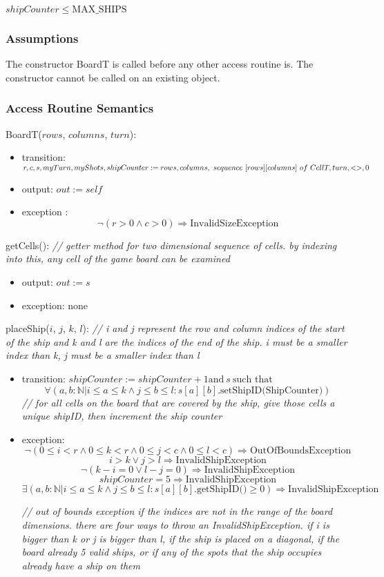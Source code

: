 \documentclass[12pt]{article}
\begin{document}
$shipCounter \leq \mbox{MAX\_SHIPS}$

\subsubsection* {Assumptions}
The constructor BoardT is called before any other access routine is. The constructor cannot be called on an existing object.

\subsubsection* {Access Routine Semantics}

BoardT($rows$, $columns$, $turn$):
\begin{itemize}
\item transition: $r, c, s, myTurn, myShots, shipCounter := rows, columns, ~sequence ~[rows][columns]~ of\newline ~CellT, turn, <>, 0$ 
\item output: $out := \mathit{self}$
\item exception : $$ \neg (r > 0 \wedge c > 0) \Rightarrow \mbox{InvalidSizeException} $$
\end{itemize}

\noindent getCells(): {\it // getter method for two dimensional sequence of cells. by indexing into this, any cell of the game board can be examined}
\begin{itemize}
\item output: $out := s$
\item exception: none
\end{itemize}

\noindent placeShip($i$, $j$, $k$, $l$): {\it // i and j represent the row and column indices of the start of the ship and k and l are the indices of the end of the ship. i must be a smaller index than k, j must be a smaller index than l}
\begin{itemize}
\item transition: $shipCounter := shipCounter + 1 \mbox{and} ~s ~\mbox{such that}$ 
$$ \forall (a, b : \mathbb{N} | i \leq a \leq k \wedge j \leq b \leq l : s[a][b].\mbox{setShipID(ShipCounter)})$$
{\it// for all cells on the board that are covered by the ship, give those cells a unique shipID, then increment the ship counter}
\item exception: 
$$ \neg (0 \leq i < r \wedge 0 \leq k < r \wedge 0 \leq j < c \wedge 0 \leq l < c) \Rightarrow \mbox{OutOfBoundsException} $$
$$ i > k \vee j > l \Rightarrow \mbox{InvalidShipException} $$
$$ \neg (k - i = 0 \vee l - j = 0) \Rightarrow \mbox{InvalidShipException} $$ 
$$ shipCounter = 5 \Rightarrow \mbox{InvalidShipException}$$
$$ \exists (a, b : \mathbb{N} | i \leq a \leq k \wedge j \leq b \leq l : s[a][b].\mbox{getShipID()} \geq 0 ) \Rightarrow \mbox{InvalidShipException}$$

{\it // out of bounds exception if the indices are not in the range of the board dimensions. there are four ways to throw an InvalidShipException. if i is bigger than k or j is bigger than l, if the ship is placed on a diagonal, if the board already 5 valid ships, or if any of the spots that the ship occupies already have a ship on them}
\end{itemize}
\end{document}
